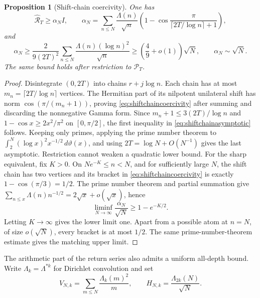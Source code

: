 \documentclass[11pt]{amsart}
\newtheorem{proposition}[theorem]{Proposition}
\theoremstyle{definition}
\theoremstyle{remark}
\begin{document}
\begin{proposition}[Shift-chain coercivity]\label{prop:shiftchaincoercivity}
One has
\begin{equation}\label{eq:shiftchaincoercivity}
 \widehat{\mathcal R}_T\ge \alpha_N I,\qquad
 \alpha_N=\sum_{n\le N}\frac{\Lambda(n)}{\sqrt n}
 \left(1-\cos\frac{\pi}{\lceil2T/\log n\rceil+1}\right),
\end{equation}
and
\begin{equation}\label{eq:shiftchainasymptotic}
 \alpha_N\ge \frac{2}{9(2T)^2}
 \sum_{n\le N}\frac{\Lambda(n)(\log n)^2}{\sqrt n}
 \ge\left(\frac49+o(1)\right)\sqrt N,
 \qquad \alpha_N\sim\sqrt N.
\end{equation}
The same bound holds after restriction to \(\mathcal P_T\).
\end{proposition}

\begin{proof}
Disintegrate \((0,2T)\) into chains \(r+j\log n\).  Each chain has at most
\(m_n=\lceil2T/\log n\rceil\) vertices.  The Hermitian part of its nilpotent
unilateral shift has norm \(\cos(\pi/(m_n+1))\), proving
\eqref{eq:shiftchaincoercivity} after summing and discarding the nonnegative
Gamma form.  Since \(m_n+1\le3(2T)/\log n\) and
\(1-\cos x\ge2x^2/\pi^2\) on \([0,\pi/2]\), the first inequality in
\eqref{eq:shiftchainasymptotic} follows.  Keeping only primes, applying the
prime number theorem to
\(\int_2^N(\log x)^2x^{-1/2}\,d\vartheta(x)\), and using
\(2T=\log N+O(N^{-1})\) gives the last asymptotic.  Restriction cannot weaken
a quadratic lower bound.  For the sharp equivalent, fix \(K>0\).  On
\(Ne^{-K}\le n<N\), and for sufficiently large \(N\), the shift chain has
two vertices and its bracket in \eqref{eq:shiftchaincoercivity} is exactly
\(1-\cos(\pi/3)=1/2\).  The prime number theorem and partial summation give
\(\sum_{n\le x}\Lambda(n)n^{-1/2}=2\sqrt x+o(\sqrt x)\), hence
\[
 \liminf_{N\to\infty}\frac{\alpha_N}{\sqrt N}\ge1-e^{-K/2}.
\]
Letting \(K\to\infty\) gives the lower limit one.  Apart from a possible
atom at \(n=N\), of size \(o(\sqrt N)\), every bracket is at most \(1/2\).
The same prime-number-theorem estimate gives the matching upper limit.
\end{proof}

The arithmetic part of the return series also admits a uniform all-depth
bound.  Write \(\Lambda_k=\Lambda^{*k}\) for Dirichlet convolution and set
\[
 V_{N,k}=\sum_{m\le N}\frac{\Lambda_k(m)^2}{m},\qquad
 H_{N,k}=\frac{\Lambda_{2k}(N)}{\sqrt N}.
\]
\end{document}

